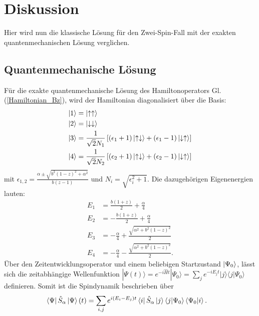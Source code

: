 \chapter{Diskussion}
Hier wird nun die klassische Lösung für den Zwei-Spin-Fall mit der exakten quantenmechanischen Lösung verglichen.
\section{Quantenmechanische Lösung}
Für die exakte quantenmechanische Lösung des Hamiltonoperators Gl. (\ref{Hamiltonian_Bz}), wird der Hamiltonian diagonalisiert über die Basis:
\begin{align}
    \ket{1} &= \ket{\uparrow\uparrow}   \\
    \ket{2} &= \ket{\downarrow\downarrow} \\
    \ket{3} &= \frac{1}{\sqrt{2}N_1}\left[(\epsilon_1+1)\ket{\uparrow\downarrow} +(\epsilon_1-1)\ket{\downarrow\uparrow} \right]\\
    \ket{4} &= \frac{1}{\sqrt{2}N_2}\left[(\epsilon_2+1)\ket{\uparrow\downarrow} +(\epsilon_2-1)\ket{\downarrow\uparrow} \right]
\end{align}
mit $\epsilon_{1,2} = \frac{\alpha \pm \sqrt{b^2(1-z)^2+\alpha^2} }{b(z-1)} $ und $N_{i} = \sqrt{\epsilon_i^2 + 1}$. Die dazugehörigen Eigenenergien lauten:
\begin{align}
    E_1 &= \frac{b(1+z)}{2} + \frac{\alpha}{4}\\
    E_2 &= -\frac{b(1+z)}{2} + \frac{\alpha}{4}\\
    E_3 &= -\frac{\alpha}{4} + \frac{\sqrt{\alpha^2 + b^2(1-z)^2}}{2}\\
    E_4 &= -\frac{\alpha}{4} - \frac{\sqrt{\alpha^2 + b^2(1-z)^2}}{2}.
\end{align}
\noindent Über den Zeitentwicklungsoperator und einem beliebigen Startzustand $\ket{\Psi_0}$, lässt sich die zeitabhängige Wellenfunktion 
$|\Psi(t)\rangle = e^{-i\hat{H}t}|\Psi_0\rangle = \sum_j e^{-i E_j t}|j\rangle\langle j|\Psi_0\rangle$ definieren. Somit ist die Spindynamik
beschrieben über
\begin{align}
    \bra{\Psi}\hat{S}_\alpha\ket{\Psi}(t) &= \sum_{i,j}e^{i(E_i-E_j)t}\bra{i}\hat{S}_\alpha\ket{j}\bra{j}\ket{\Psi_0}\bra{\Psi_0}\ket{i}.
\end{align}
